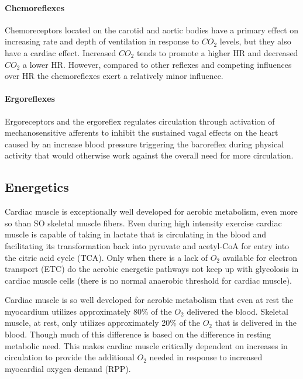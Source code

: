 \paragraph{Chemoreflexes}
Chemoreceptors located on the carotid and aortic bodies have a primary effect on increasing rate and depth of ventilation in response to $CO_2$ levels, but they also have a cardiac effect. Increased $CO_2$ tends to promote a higher HR and decreased $CO_2$ a lower HR. However, compared to other reflexes and competing influences over HR the chemoreflexes exert a relatively minor influence.

\paragraph{Ergoreflexes}
Ergoreceptors and the ergoreflex regulates circulation through activation of mechanosensitive afferents to inhibit the sustained vagal effects on the heart caused by an increase blood pressure triggering the baroreflex during physical activity that would otherwise work against the overall need for more circulation.



\subsection{Energetics}

Cardiac muscle is exceptionally well developed for aerobic metabolism, even more so than SO skeletal muscle fibers. Even during high intensity exercise cardiac muscle is capable of taking in lactate that is circulating in the blood and facilitating its transformation back into pyruvate and acetyl-CoA for entry into the citric acid cycle (TCA). Only when there is a lack of $O_2$ available for electron transport (ETC) do the aerobic energetic pathways not keep up with glycolosis in cardiac muscle cells (there is no normal anaerobic threshold for cardiac muscle). 

Cardiac muscle is so well developed for aerobic metabolism that even at rest the myocardium utilizes approximately 80\% of the $O_2$ delivered the blood. Skeletal muscle, at rest, only utilizes approximately 20\% of the $O_2$ that is delivered in the blood. Though much of this difference is based on the difference in resting metabolic need. This makes cardiac muscle critically dependent on increases in circulation to provide the additional $O_2$ needed in response to increased myocardial oxygen demand (RPP).

